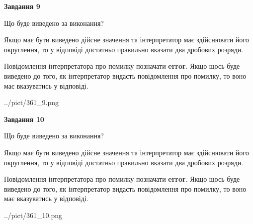\documentclass[12pt, ukrainian]{article}
\begin{document}
{\begin {Large}
{\begin {center}\textbf{Завдання 9}\end {center}}\par
Що буде виведено за виконання? \par

Якщо має бути виведено дійсне значення та інтерпретатор має здійснювати його округлення, 
то у відповіді достатньо правильно вказати два дробових розряди.

Повідомлення інтерпретатора про помилку позначати \textbf{error}.
Якщо щось буде виведено до того, як інтерпретатор видасть повідомлення про помилку, 
то воно має вказуватись у відповіді. \par

\begin{center}
	{../pict/361_9.png}
\end{center}
\newpage

{\begin {center}\textbf{Завдання 10}\end {center}}\par
Що буде виведено за виконання? \par

Якщо має бути виведено дійсне значення та інтерпретатор має здійснювати його округлення, 
то у відповіді достатньо правильно вказати два дробових розряди.

Повідомлення інтерпретатора про помилку позначати \textbf{error}.
Якщо щось буде виведено до того, як інтерпретатор видасть повідомлення про помилку, 
то воно має вказуватись у відповіді. \par

\begin{center}
	{../pict/361_10.png}
\end{center}
\newpage

\end {Large}}
\end{document}
